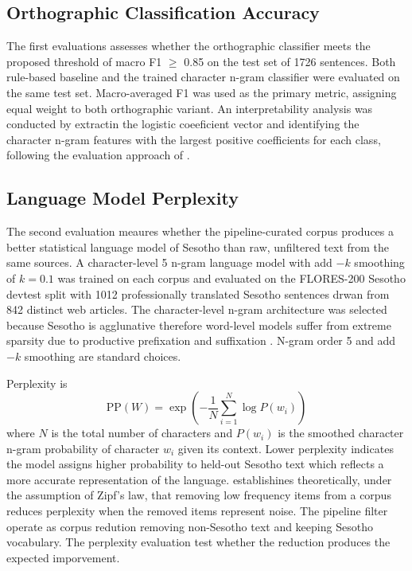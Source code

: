 \documentclass[11pt,a4paper]{article}
\begin{document}
\subsection{Orthographic Classification Accuracy}

The first evaluations assesses whether the orthographic classifier meets the proposed threshold of macro F1 $\geq$ 0.85 on the test set of 1726 sentences. Both rule-based baseline and the trained character n-gram classifier were evaluated on the same test set. Macro-averaged F1 was used as the primary metric, assigning equal weight to both orthographic variant. An interpretability analysis was conducted by extractin the logistic coeeficient vector and identifying the character n-gram features with the largest positive coefficients for each class, following the evaluation approach of \citet{de2024data}.

\subsection{Language Model Perplexity}

The second evaluation meaures whether the pipeline-curated corpus produces a better statistical language model of Sesotho than raw, unfiltered text from the same sources. A character-level 5 n-gram language model with add $-k$ smoothing of $k=0.1$ was trained on each corpus and evaluated on the FLORES-200 Sesotho devtest split \citep{nllb2022} with 1012 professionally translated Sesotho sentences drwan from 842 distinct web articles. The character-level n-gram architecture was selected because Sesotho is agglunative therefore word-level models suffer from extreme sparsity due to productive prefixation and suffixation \citep{kambarami2021computational}. N-gram order 5 and add $-k$ smoothing are standard choices.

Perplexity is 
\begin{equation}
    \text{PP}(W) = \exp\!\left(-\frac{1}{N} \sum_{i=1}^{N} \log P(w_i)\right)
\end{equation}
where $N$ is the total number of characters and $P(w_i)$ is the smoothed character n-gram probability of character $w_i$ given its context. Lower perplexity indicates the model assigns higher probability to held-out Sesotho text which reflects a more accurate representation of the  language. \citet{kobayashi2014perplexity} establishines theoretically, under the assumption of Zipf's law, that removing low frequency items from a corpus reduces perplexity when the removed items represent noise. The pipeline filter operate as corpus redution removing non-Sesotho text and keeping Sesotho vocabulary. The perplexity evaluation test whether the reduction produces the expected imporvement. 
\end{document}
